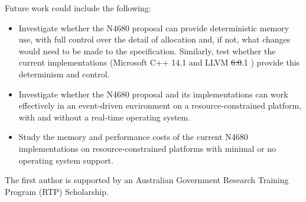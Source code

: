 \documentclass[format=acmsmall, review=false, screen=false]{acmart}
\providecommand{\DIFadd}[1]{{\protect\color{blue}\uwave{#1}}} %
\providecommand{\DIFdel}[1]{{\protect\color{red}\sout{#1}}}                      %
\providecommand{\DIFaddbegin}{} %
\providecommand{\DIFaddend}{} %
\providecommand{\DIFdelbegin}{} %
\providecommand{\DIFdelend}{} %
\newcommand{\DIFscaledelfig}{0.5}
\newlength{\DIFdelgraphicswidth} %
\newlength{\DIFdelgraphicsheight} %
\newcommand{\DIFaddincludegraphics}[2][]{{\color{blue}\fbox{\DIFOincludegraphics[#1]{#2}}}} %
\newcommand{\DIFdelincludegraphics}[2][]{%
\sbox{\DIFdelgraphicsbox}{\DIFOincludegraphics[#1]{#2}}%
\settoboxwidth{\DIFdelgraphicswidth}{\DIFdelgraphicsbox} %
\settoboxtotalheight{\DIFdelgraphicsheight}{\DIFdelgraphicsbox} %
\scalebox{\DIFscaledelfig}{%
\parbox[b]{\DIFdelgraphicswidth}{\usebox{\DIFdelgraphicsbox}\\[-\baselineskip] \rule{\DIFdelgraphicswidth}{0em}}\llap{\resizebox{\DIFdelgraphicswidth}{\DIFdelgraphicsheight}{%
\setlength{\unitlength}{\DIFdelgraphicswidth}%
\begin{picture}(1,1)%
\thicklines\linethickness{2pt} %
{\color[rgb]{1,0,0}\put(0,0){\framebox(1,1){}}}%
{\color[rgb]{1,0,0}\put(0,0){\line( 1,1){1}}}%
{\color[rgb]{1,0,0}\put(0,1){\line(1,-1){1}}}%
\end{picture}%
}\hspace*{3pt}}} %
} %
\DeclareRobustCommand{\DIFaddbegin}{\DIFOaddbegin \let\includegraphics\DIFaddincludegraphics} %
\DeclareRobustCommand{\DIFaddend}{\DIFOaddend \let\includegraphics\DIFOincludegraphics} %
\DeclareRobustCommand{\DIFdelbegin}{\DIFOdelbegin \let\includegraphics\DIFdelincludegraphics} %
\DeclareRobustCommand{\DIFdelend}{\DIFOaddend \let\includegraphics\DIFOincludegraphics} %
\begin{document}
Future work could include the following:
\begin{itemize}
	\item Investigate whether the N4680 proposal can provide deterministic memory use, with full control over the detail of allocation and, if not, what changes would need to be made to the specification. Similarly, test whether the current implementations (Microsoft C++ 14.1 \cite{Microsoft2018} and LLVM \DIFdelbegin \DIFdel{6.0}\DIFdelend \DIFaddbegin \DIFadd{7.0}\DIFaddend .1 \cite{LLVMProject2018}) provide this determinism and control.
	\item Investigate whether the N4680 proposal and its implementations can work effectively in an event-driven environment on a resource-constrained platform, with and without a real-time operating system.
	\item Study the memory and performance costs of the current N4680 implementations on resource-constrained platforms with minimal or no operating system support.
\end{itemize}

\begin{acks}
The first author is supported by an Australian Government Research Training Program (RTP) Scholarship.
\end{acks}



\end{document}
